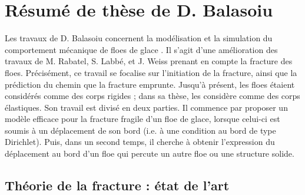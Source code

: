 

\section{Résumé de thèse de D. Balasoiu}








Les travaux de D. Balasoiu concernent la modélisation et la simulation du comportement mécanique de floes de glace \parencite{balasoiu2020halthesis}. Il s'agit d'une amélioration des travaux de M. Rabatel, S. Labbé, et J. Weiss \parencite{rabatel2015thesis,rabatel2015dynamics} prenant en compte la fracture des floes. Précisément, ce travail se focalise sur l’initiation de la fracture, ainsi que la prédiction du chemin que la fracture emprunte. Jusqu’à présent, les floes étaient considérés comme des corps rigides ; dans sa thèse, \citeauthor{balasoiu2020halthesis} les considère comme des corps élastiques. Son travail est divisé en deux parties. Il commence par proposer un modèle efficace pour la fracture fragile d’un floe de glace, lorsque celui-ci est soumis à un déplacement de son bord (i.e. à une condition au bord de type Dirichlet). Puis, dans un second temps, il cherche à obtenir l’expression du déplacement au bord d’un floe qui percute un autre floe ou une structure solide.

\subsection{Théorie de la fracture : état de l’art} 
 
